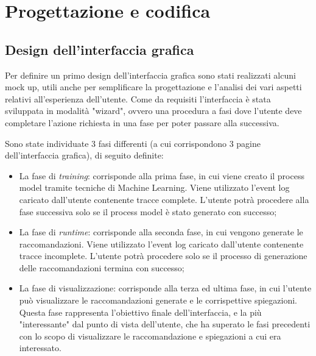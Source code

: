 
\chapter{Progettazione e codifica}
\label{cap5}

\section{Design dell'interfaccia grafica}
\label{sec:design-gui}
Per definire un primo design dell'interfaccia grafica sono stati realizzati alcuni \gls{mock up}, utili anche per semplificare la progettazione e l'analisi dei vari aspetti relativi all'esperienza dell'utente.
Come da requisiti l'interfaccia è stata sviluppata in modalità "wizard", ovvero una procedura a fasi dove l'utente deve completare l'azione richiesta in una fase per poter passare alla successiva.

Sono state individuate 3 fasi differenti (a cui corrispondono 3 pagine dell'interfaccia grafica), di seguito definite:

\begin{itemize}
\item La fase di \textit{training}: corrisponde alla prima fase, in cui viene creato il process model tramite tecniche di Machine Learning. Viene utilizzato l'event log caricato dall'utente contenente tracce complete. L'utente potrà procedere alla fase successiva solo se il process model è stato generato con successo;

\item La fase di \textit{runtime}: corrisponde alla seconda fase, in cui vengono generate le raccomandazioni. Viene utilizzato l'event log caricato dall'utente contenente tracce incomplete. L'utente potrà procedere solo se il processo di generazione delle raccomandazioni termina con successo;

\item La fase di visualizzazione: corrisponde alla terza ed ultima fase, in cui l'utente può visualizzare le raccomandazioni generate e le corrispettive spiegazioni. Questa fase rappresenta l'obiettivo finale dell'interfaccia, e la più "interessante" dal punto di vista dell'utente, che ha superato le fasi precedenti con lo scopo di visualizzare le raccomandazione e spiegazioni a cui era interessato.

\end{itemize}

